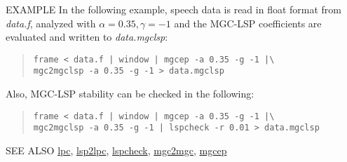 \begin{qsection}{EXAMPLE}
In the following example, speech data is read in float format from
{\em data.f}, analyzed with $\alpha = 0.35, \gamma = -1$
and the MGC-LSP coefficients are evaluated and written to {\em data.mgclsp}:
\begin{quote}
\verb!frame < data.f | window | mgcep -a 0.35 -g -1 |\!\\
\verb!mgc2mgclsp -a 0.35 -g -1 > data.mgclsp!
\end{quote}
Also, MGC-LSP stability can be checked in the following:
\begin{quote}
\verb!frame < data.f | window | mgcep -a 0.35 -g -1 |\!\\
\verb!mgc2mgclsp -a 0.35 -g -1 | lspcheck -r 0.01 > data.mgclsp !
\end{quote}
\end{qsection}

\begin{qsection}{SEE ALSO}
\hyperlink{lpc}{lpc},
\hyperlink{lsp2lpc}{lsp2lpc},
\hyperlink{lspcheck}{lspcheck},
\hyperlink{mgc2mgc}{mgc2mgc},
\hyperlink{mgcep}{mgcep}
\end{qsection}
